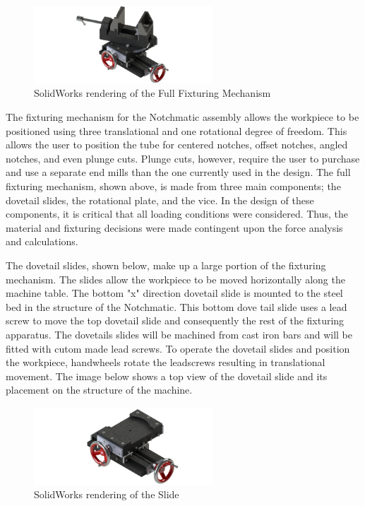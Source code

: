 \begin{figure}[H]
    \centering
    \includegraphics[width=0.6\textwidth]{./fall-report pictures/Chapter2-MachineDescription/Fixturing}
    \caption{SolidWorks rendering of the Full Fixturing Mechanism}
    \label{fig:Electrical:Fixturing}
\end{figure}

The fixturing mechanism for the Notchmatic assembly allows the workpiece to be positioned using three translational and one rotational degree of freedom. This allows the user to position the tube for centered notches, offset notches, angled notches, and even plunge cuts. Plunge cuts, however, require the user to purchase and use a separate end mills than the one currently used in the design. The full fixturing mechanism, shown above, is made from three main components; the dovetail slides, the rotational plate, and the vice. In the design of these components, it is critical that all loading conditions were considered. Thus, the material and fixturing decisions were made contingent upon the force analysis and calculations. 

The dovetail slides, shown below, make up a large portion of the fixturing mechanism. The slides allow the workpiece to be moved horizontally along the machine table. The bottom "x" direction dovetail slide is mounted to the steel bed in the structure of the Notchmatic. This bottom dove tail slide uses a lead screw to move the top dovetail slide and consequently the rest of the fixturing apparatus. The dovetails slides will be machined from cast iron bars and will be fitted with cutom made lead screws. To operate the dovetail slides and position the workpiece, handwheels rotate the leadscrews resulting in translational movement. The image below shows a top view of the dovetail slide and its placement on the structure of the machine. 

\begin{figure}[H]
    \centering
    \includegraphics[width=0.6\textwidth]{./fall-report pictures/Chapter2-MachineDescription/Slide}
    \caption{SolidWorks rendering of the Slide}
    \label{fig:Electrical:Slide}
\end{figure}

